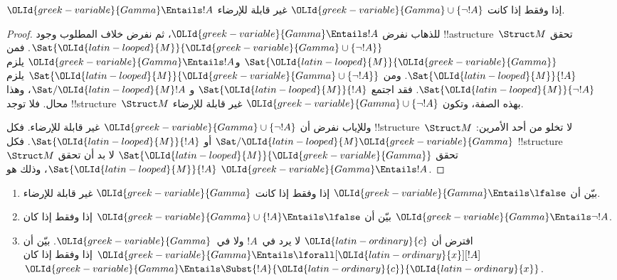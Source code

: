 \documentclass[../../../include/open-logic-section]{subfiles}
\begin{document}
\begin{prop}
${\OLId{greek-variable}{Gamma}} \Entails !A$ إذا وفقط إذا كانت
${\OLId{greek-variable}{Gamma}} \cup \{\lnot !A\}$ غير قابلة للإرضاء.
\end{prop}

\begin{proof}
للذهاب نفرض ${\OLId{greek-variable}{Gamma}} \Entails !A$، ثم نفرض خلاف المطلوب وجود
!!a{structure}~$\Struct M$ تحقق
$\Sat{{\OLId{latin-looped}{M}}}{{\OLId{greek-variable}{Gamma}} \cup \{ \lnot !A \}}$. فمن
$\Sat{{\OLId{latin-looped}{M}}}{{\OLId{greek-variable}{Gamma}}}$ و${\OLId{greek-variable}{Gamma}} \Entails !A$ يلزم $\Sat{{\OLId{latin-looped}{M}}}{!A}$.
ومن $\Sat{{\OLId{latin-looped}{M}}}{{\OLId{greek-variable}{Gamma}}\cup \{ \lnot !A \}}$ يلزم
$\Sat{{\OLId{latin-looped}{M}}}{\lnot !A}$. فقد اجتمع $\Sat{{\OLId{latin-looped}{M}}}{!A}$ و
$\Sat/{{\OLId{latin-looped}{M}}}{!A}$، وهذا محال. فلا توجد
!!{structure}~$\Struct M$ بهذه الصفة، وتكون
${\OLId{greek-variable}{Gamma}} \cup \{ \lnot !A \}$ غير قابلة للإرضاء.

وللإياب نفرض أن ${\OLId{greek-variable}{Gamma}} \cup \{ \lnot !A \}$ غير قابلة للإرضاء.
فكل !!{structure}~$\Struct M$ لا تخلو من أحد الأمرين:
$\Sat/{{\OLId{latin-looped}{M}}}{{\OLId{greek-variable}{Gamma}}}$ أو $\Sat{{\OLId{latin-looped}{M}}}{!A}$. فكل !!{structure}
~$\Struct M$ تحقق $\Sat{{\OLId{latin-looped}{M}}}{{\OLId{greek-variable}{Gamma}}}$ لا بد أن تحقق $\Sat{{\OLId{latin-looped}{M}}}{!A}$،
وذلك هو ${\OLId{greek-variable}{Gamma}} \Entails !A$.
\end{proof}

\begin{prob}
\begin{enumerate}
\item بيّن أن ${\OLId{greek-variable}{Gamma}} \Entails \lfalse$ إذا وفقط إذا كانت ${\OLId{greek-variable}{Gamma}}$
  غير قابلة للإرضاء.
\item بيّن أن ${\OLId{greek-variable}{Gamma}} \cup \{!A\} \Entails \lfalse$ إذا وفقط إذا
  كان ${\OLId{greek-variable}{Gamma}} \Entails \lnot !A$.
\item افترض أن ${\OLId{latin-ordinary}{c}}$ لا يرد في~$!A$ ولا في~${\OLId{greek-variable}{Gamma}}$. بيّن أن
  ${\OLId{greek-variable}{Gamma}} \Entails \lforall[{\OLId{latin-ordinary}{x}}][!A]$ إذا وفقط إذا كان
  ${\OLId{greek-variable}{Gamma}} \Entails \Subst{!A}{{\OLId{latin-ordinary}{c}}}{{\OLId{latin-ordinary}{x}}}$.
\end{enumerate}
\end{prob}
\end{document}
